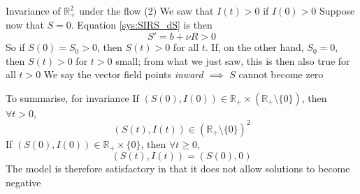 \documentclass[aspectratio=43]{beamer}
\begin{document}
% 

\begin{frame}{Invariance of $\mathbb{R}_+^2$ under the flow (2)} 
We saw that $I(t)>0$ if $I(0)>0$
\vfill
Suppose now that $S=0$. Equation \eqref{sys:SIRS_dS} is then
$$
S' = b+\nu R>0
$$
\vfill
So if $S(0)=S_0>0$, then $S(t)>0$ for all $t$. If, on the other hand, $S_0=0$, then $S(t)>0$ for $t>0$ small; from what we just saw, this is then also true for all $t>0$
\vfill
We say the vector field points \emph{inward}
\vfill
$\implies$ $S$ cannot become zero
\end{frame}

\begin{frame}{To summarise, for invariance} 
\bbullet If $(S(0),I(0))\in\mathbb{R}_+\times(\mathbb{R}_+\setminus\{0\})$, then $\forall t>0$,
$$(S(t),I(t))\in(\mathbb{R}_+\setminus\{0\})^2$$
\vfill
\bbullet If $(S(0),I(0))\in\mathbb{R}_+\times\{0\}$, then $\forall t\geq 0$, 
$$(S(t),I(t))=(S(0),0)$$
\vfill
The model is therefore satisfactory in that it does not allow solutions to become negative
\end{frame}
\end{document}
